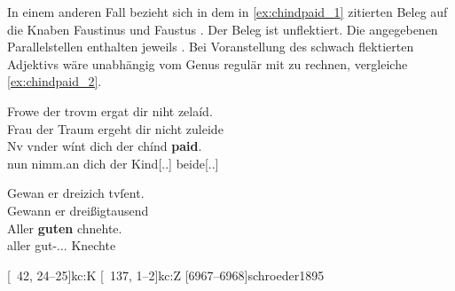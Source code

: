 
In einem anderen Fall bezieht sich in dem in \cref{ex:chindpaid_1} zitierten
Beleg   auf die Knaben Faustinus und Faustus
\autocites[\pno~10\rb, 5--6]{kc:M}[vgl.][1239--1240]{schroeder1895}. Der Beleg
ist unflektiert. Die angegebenen Parallelstellen enthalten jeweils  . Bei Voranstellung des schwach
flektierten Adjektivs wäre unabhängig vom Genus regulär mit  zu
rechnen, vergleiche \cref{ex:chindpaid_2}.

\begin{exe}
\ex \label{ex:chindpaid}
\begin{xlist}
	\ex \label{ex:chindpaid_1}
		\gll Frowe der trovm ergat dir niht zelaíd. \\
			Frau der Traum ergeht dir nicht zuleide \\
	\sn \gll Nv {vnder wínt} dich der chínd \textbf{paid}. \\
			nun nimm.an dich der Kind[\Gen.\Pl.\NeutM] beide[\Gen.\Pl.\NeutM] \\
		\begin{taggedline}{\parencites%
			[\pno~11\ra, 17]{kc:M}[vgl.]%
			[\pno~6\rb, 22--23]{kc:A1}
			[\pno~8\ra, 12--13]{kc:H}
			[1354]{schroeder1895}
		} %
		\trans {}
		\end{taggedline}

	\ex \label{ex:chindpaid_2}
		\gll Gewan er {dreizich tvſent}. \\
			Gewann er dreißigtausend \\
	\sn \gll Aller \textbf{guten} chnehte. \\
			aller gut-\Gen.\Pl.\MascM.\Wk{} Knechte \\
		\begin{taggedline}{\parencites%
			[\pno~52\vb, 20--21]{kc:M}[vgl.]%
			[\pno~30\rb, 14--15]{kc:A1}
			[\pno~41\rb, 36--37]{kc:H}
			[\pno~19\vc, 23--24]{kc:B1}
			[\pno~33\vb, 20--21]{kc:VB}
			[\pno~42\ra, 24--25]{kc:K}
			[\pno~137\va, 1--2]{kc:Z}
			[6967--6968]{schroeder1895}
		}
		\trans {}
		\end{taggedline}
\end{xlist}
\end{exe}

